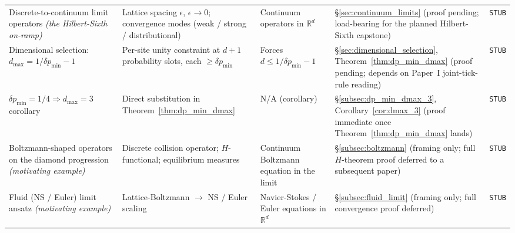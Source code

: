 {\begin{longtable}{@{}p{2.8cm}p{3.8cm}p{3.0cm}p{4.4cm}p{1.0cm}@{}}
Discrete-to-continuum limit operators \emph{(the Hilbert-Sixth on-ramp)}
    & Lattice spacing $\epsilon$, $\epsilon \to 0$; convergence modes (weak / strong / distributional)
    & Continuum operators in $\mathbb{R}^d$
    & \S\ref{sec:continuum_limits} (proof pending; load-bearing for the planned Hilbert-Sixth capstone)
    & \texttt{STUB} \\

Dimensional selection: $d_{\max} = 1/\delta p_{\min} - 1$
    & Per-site unity constraint at $d+1$ probability slots, each $\geq \delta p_{\min}$
    & Forces $d \leq 1/\delta p_{\min} - 1$
    & \S\ref{sec:dimensional_selection}, Theorem~\ref{thm:dp_min_dmax} (proof pending; depends on Paper~I joint-tick-rule reading)
    & \texttt{STUB} \\

$\delta p_{\min} = 1/4 \Rightarrow d_{\max} = 3$ corollary
    & Direct substitution in Theorem~\ref{thm:dp_min_dmax}
    & N/A (corollary)
    & \S\ref{subsec:dp_min_dmax_3}, Corollary~\ref{cor:dmax_3} (proof immediate once Theorem~\ref{thm:dp_min_dmax} lands)
    & \texttt{STUB} \\

Boltzmann-shaped operators on the diamond progression \emph{(motivating example)}
    & Discrete collision operator; $H$-functional; equilibrium measures
    & Continuum Boltzmann equation in the limit
    & \S\ref{subsec:boltzmann} (framing only; full $H$-theorem proof deferred to a subsequent paper)
    & \texttt{STUB} \\

Fluid (NS / Euler) limit ansatz \emph{(motivating example)}
    & Lattice-Boltzmann $\to$ NS / Euler scaling
    & Navier-Stokes / Euler equations in $\mathbb{R}^d$
    & \S\ref{subsec:fluid_limit} (framing only; full convergence proof deferred)
    & \texttt{STUB} \\

\hline
\end{longtable}
}

